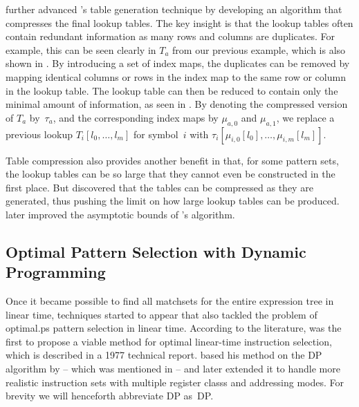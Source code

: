 {\textcite{Chase1987} further advanced \citeauthor{Hoffmann1982}'s table
generation technique by developing an algorithm that compresses the final lookup
tables.
%
The key insight is that the lookup tables often contain redundant
information as many rows and columns are duplicates.
%
For example, this can be
seen clearly in $T_a$ from our previous example, which is also shown in
.
%
By introducing a set of
\glspl{index map}, the duplicates can be removed by mapping identical columns or
rows in the \gls{index map} to the same row or column in the lookup table.
%
The
lookup table can then be reduced to contain only the minimal amount of
information, as seen in .
%
By denoting
the compressed version of $T_a$ by~$\tau_a$, and the corresponding \glspl{index
  map} by $\mu_{a,0}$ and $\mu_{a,1}$, we replace a previous lookup
\mbox{$T_i[l_0, \ldots, l_m]$} for symbol~$i$ with \mbox{$\tau_i[\mu_{i,0}[l_0],
    \ldots, \mu_{i,m}[l_m]]$}.

Table compression also provides another benefit in that, for some \glspl{pattern
  set}, the lookup tables can be so large that they cannot even be constructed
in the first place.
%
But \citeauthor{Chase1987} discovered that the tables can be
compressed as they are generated, thus pushing the limit on how large lookup
tables can be produced.
%
\textcite{Cai1992} later improved the asymptotic bounds
of \citeauthor{Chase1987}'s algorithm.


\subsection{Optimal Pattern Selection with Dynamic Programming}

Once it became possible to find all \glspl{matchset} for the entire \gls{expression tree} in linear time, techniques started to appear that also tackled the
problem of \gls{optimal.ps} \gls{pattern selection} in linear
time.
%
According to the literature, \textcite{Ripken1977} was the first to
propose a viable method for optimal linear-time \gls{instruction
  selection}, which is described in a 1977 technical
report.
%
\citeauthor{Ripken1977} based his method on the \glsdesc{DP} algorithm
by \citeauthor{Aho1976a} -- which was mentioned in
\unskip%
%
 -- and later extended it to handle more realistic \glspl{instruction set} with
multiple \glspl{register class} and \glspl{addressing mode}.
%
For brevity we will
henceforth abbreviate \glsdesc{DP} as~\gls{DP}.

}
